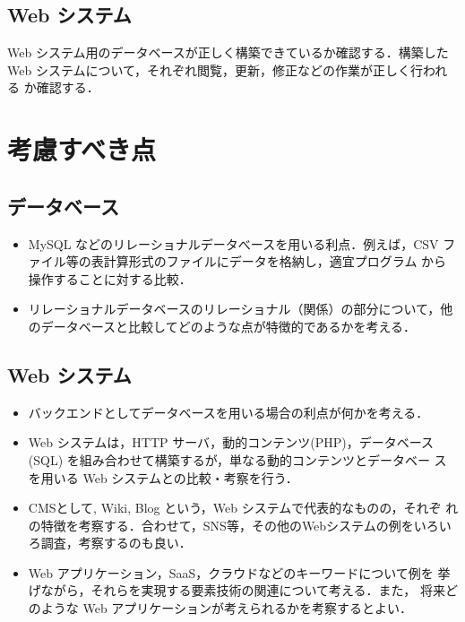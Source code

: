 \subsection*{Web システム}
Web システム用のデータベースが正しく構築できているか確認する．構築した 
Web システムについて，それぞれ閲覧，更新，修正などの作業が正しく行われる
か確認する．

\section{考慮すべき点}

\subsection*{データベース}
\begin{itemize}
 \item MySQL などのリレーショナルデータべースを用いる利点．例えば，CSV
       ファイル等の表計算形式のファイルにデータを格納し，適宜プログラム
       から操作することに対する比較．
 \item リレーショナルデータベースのリレーショナル（関係）の部分について，他のデータベースと比較してどのような点が特徴的であるかを考える．
\end{itemize}

\subsection*{Web システム}
\begin{itemize}
 \item バックエンドとしてデータベースを用いる場合の利点が何かを考える．
 \item Web システムは，HTTP サーバ，動的コンテンツ(PHP)，データベース
       (SQL) を組み合わせて構築するが，単なる動的コンテンツとデータベー
       スを用いる Web システムとの比較・考察を行う．
 \item CMSとして, Wiki, Blog という，Web システムで代表的なものの，それぞ
       れの特徴を考察する．合わせて，SNS等，その他のWebシステムの例をいろいろ調査，考察するのも良い．
 \item Web アプリケーション，SaaS，クラウドなどのキーワードについて例を
       挙げながら，それらを実現する要素技術の関連について考える．また，
       将来どのような Web アプリケーションが考えられるかを考察するとよい．
\end{itemize}

\clearpage


